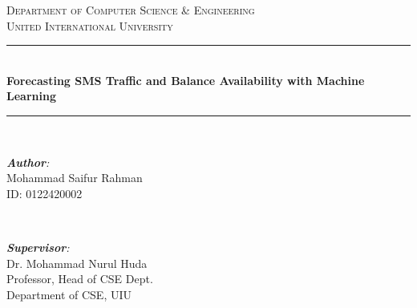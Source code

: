 \documentclass[12pt]{book} %
\begin{document}
\begin{titlepage}

\newcommand{\HRule}{\rule{\linewidth}{0.5mm}} %
\center %
 

\textsc{\Large Department of Computer Science \& Engineering}\\[0.5cm] %
\textsc{\Huge United International University}\\[1cm] %


\HRule \\[0.4cm]
{ {\Large \textbf{Forecasting SMS Traffic and Balance Availability with Machine Learning}}}\\
\HRule \\ [1cm]

\begin{minipage}{0.5\textwidth}
    \begin{flushleft} \small
    \emph{\textbf{\large Author}:}\\
    Mohammad Saifur Rahman  \\ %
    ID: 0122420002\\

    \end{flushleft}
    \end{minipage}
    ~
    \begin{minipage}{0.4\textwidth}
    \begin{flushright} \large
    \emph{\textbf{Supervisor}:} \\
    Dr. Mohammad Nurul Huda  \\ %
    Professor, Head of CSE Dept. \\
    Department of CSE, UIU\\
    \end{flushright}


\end{minipage}
\end{titlepage}
\end{document}
